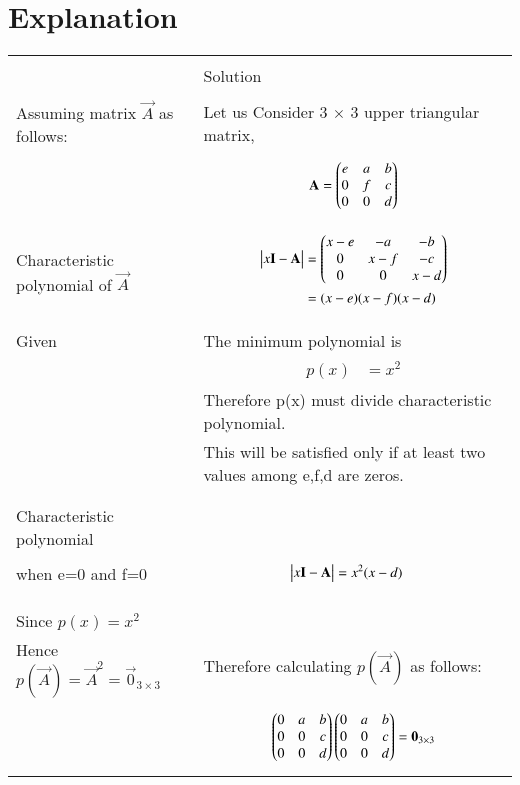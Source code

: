 \documentclass[journal,12pt]{IEEEtran}
\begin{document}
\section{\textbf{Explanation}}
\renewcommand{\thetable}{2}
\begin{longtable}{|l|l|}
\hline
\multirow{3}{*}{} & \\
Statement&Solution\\
\hline
&\\
Assuming matrix $\vec{A}$ as follows:&Let us Consider 3 $\times$ 3 upper triangular matrix,\\
&\parbox{6cm}{\begin{align*}
    \mathbf{A}=\begin{pmatrix}e&a&b\\0&f&c\\0&0&d\end{pmatrix}
\end{align*}}\\
\hline
Characteristic polynomial of $\vec{A}$&
\parbox{6cm}{\begin{align*}
    \begin{vmatrix}x\mathbf{I}-\mathbf{A}\end{vmatrix}&=\begin{pmatrix}x-e&-a&-b\\0&x-f&-c\\0&0&x-d\end{pmatrix}\\
    &=(x-e)(x-f)(x-d)
\end{align*}}\\
\hline
&\\
Given&The minimum polynomial is\\
&\parbox{6cm}{\begin{align*}
    p(x)&=x^2
\end{align*}}\\
&Therefore p(x) must divide characteristic polynomial.\\
&This will be satisfied only if at least two values among e,f,d are zeros.\\
&\\
\hline
&\\
Characteristic polynomial&\\
when e=0 and f=0&\parbox{6cm}{\begin{align*}
    \begin{vmatrix}x\mathbf{I}-\mathbf{A}\end{vmatrix}&=x^2(x-d)
\end{align*}}\\
&\\
\hline
&\\
Since $p(x)=x^2$&\\
Hence $ p(\vec{A})=\vec{A}^2=\vec{0}_{3\times3}$&Therefore calculating $p(\vec{A})$ as follows:\\
&\parbox{6cm}{\begin{align*}
    \myvec{0&a&b\\0&0&c\\0&0&d} \myvec{0&a&b\\0&0&c\\0&0&d}&=\vec{0}_{3\times3}\\

\end{align*}}
\end{longtable}
\end{document}
